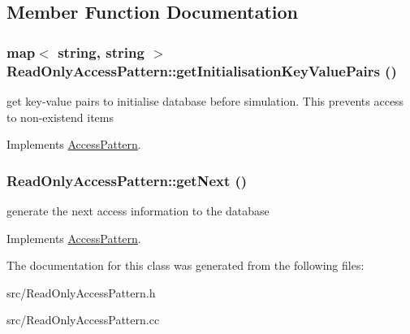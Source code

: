 \subsection{Member Function Documentation}
\hypertarget{classReadOnlyAccessPattern_a2e6ce8d90050b038ffbf643b344e0eb5}{
\subsubsection[{getInitialisationKeyValuePairs}]{\setlength{\rightskip}{0pt plus 5cm}map$<$ string, string $>$ ReadOnlyAccessPattern::getInitialisationKeyValuePairs ()}}
\label{classReadOnlyAccessPattern_a2e6ce8d90050b038ffbf643b344e0eb5}
get key-\/value pairs to initialise database before simulation. This prevents access to non-\/existend items 

Implements \hyperlink{classAccessPattern_afa72bed11401bfd96e8fa88acd72934b}{AccessPattern}.\hypertarget{classReadOnlyAccessPattern_a324b6da6296a17144d51db2841e16ba4}{
\subsubsection[{getNext}]{ ReadOnlyAccessPattern::getNext ()}}
\label{classReadOnlyAccessPattern_a324b6da6296a17144d51db2841e16ba4}
generate the next access information to the database 

Implements \hyperlink{classAccessPattern_a8c46aedb717e862598524f250f23086f}{AccessPattern}.

The documentation for this class was generated from the following files:\begin{DoxyCompactItemize}
\item 
src/ReadOnlyAccessPattern.h\item 
src/ReadOnlyAccessPattern.cc\end{DoxyCompactItemize}
